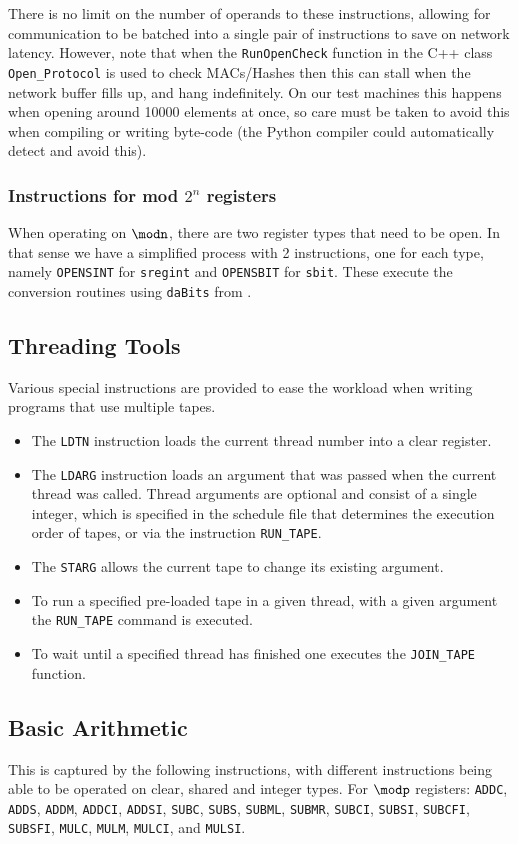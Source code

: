 There is no limit on the number of operands to these instructions,
allowing for communication to be batched into a single pair of
instructions to save on network latency. However, note that when
the \texttt{RunOpenCheck} function in the C++ class \texttt{Open\_Protocol}
is used to check MACs/Hashes then this can stall when the network buffer fills 
up, and hang indefinitely.
On our test machines this happens when opening around 10000 elements
at once, so care must be taken to avoid this when compiling or writing
byte-code (the Python compiler could automatically detect and avoid
this).

\subsubsection{Instructions for mod $2^n$ registers}
When operating on $\modn$, there are two register types that need to be open. In that sense we have a simplified process with 2 instructions, one for each type, namely \verb+OPENSINT+ for \verb+sregint+ and \verb+OPENSBIT+ for \verb|sbit|.
These execute the conversion routines using \verb+daBits+ from \cite{daBitPaper}.

\subsection{Threading Tools}
Various special instructions are provided to ease the workload when writing
programs that use multiple tapes. 
\begin{itemize}
\item The \verb+LDTN+ instruction loads the current thread number into 
a clear register.
\item The \verb+LDARG+ instruction loads an argument that was passed 
when the current thread was called.
Thread arguments are optional and consist of a single integer, 
which is specified in the schedule file that determines the execution 
order of tapes, or via the instruction \verb+RUN_TAPE+.
\item The \verb+STARG+ allows the current tape to change its
existing argument.
\item To run a specified pre-loaded tape in a given thread, with
a given argument the \verb+RUN_TAPE+ command is executed.
\item To wait until a specified thread has finished one executes
the \verb+JOIN_TAPE+ function.
\end{itemize}

\subsection{Basic Arithmetic}
This is captured by the following instructions,
with different instructions being able to be operated
on clear, shared and integer types.
For $\modp$ registers:
    \verb+ADDC+,
    \verb+ADDS+,
    \verb+ADDM+,
    \verb+ADDCI+,
    \verb+ADDSI+,
    \verb+SUBC+,
    \verb+SUBS+,
    \verb+SUBML+,
    \verb+SUBMR+,
    \verb+SUBCI+,
    \verb+SUBSI+,
    \verb+SUBCFI+,
    \verb+SUBSFI+,
    \verb+MULC+,
    \verb+MULM+,
    \verb+MULCI+,
    and
    \verb+MULSI+.

